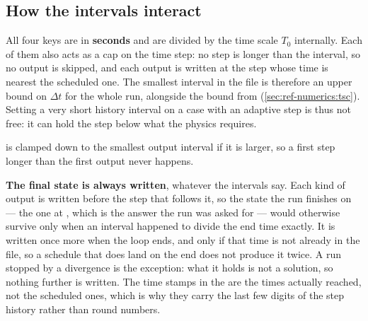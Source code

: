 \subsection{How the intervals interact}
\label{sec:output:intervals}

All four  keys are in \textbf{seconds} and are divided by the
time scale $T_0$ internally. Each of them also acts as a cap on the time step:
no step is longer than the interval, so no output is skipped, and each output
is written at the step whose time is nearest the scheduled one. The smallest interval in the file is
therefore an upper bound on $\Delta t$ for the whole run, alongside the bound
from 
(\cref{sec:ref-numerics:tsc}). Setting a very short history interval on a case
with an adaptive step is thus not free: it can hold the step below what the
physics requires.

 is clamped down to the smallest output interval if it
is larger, so a first step longer than the first output never happens.

\textbf{The final state is always written}, whatever the intervals say. Each
kind of output is written before the step that follows it, so the state the run
finishes on --- the one at , which is the answer the run was asked
for --- would otherwise survive only when an interval happened to divide the
end time exactly. It is written once more when the loop ends, and only if that
time is not already in the file, so a schedule that does land on the end does
not produce it twice. A run stopped by a divergence is the exception: what it
holds is not a solution, so nothing further is written. The time stamps in the
 are the times actually reached, not the scheduled ones, which is
why they carry the last few digits of the step history rather than round
numbers.

\subsection{}

